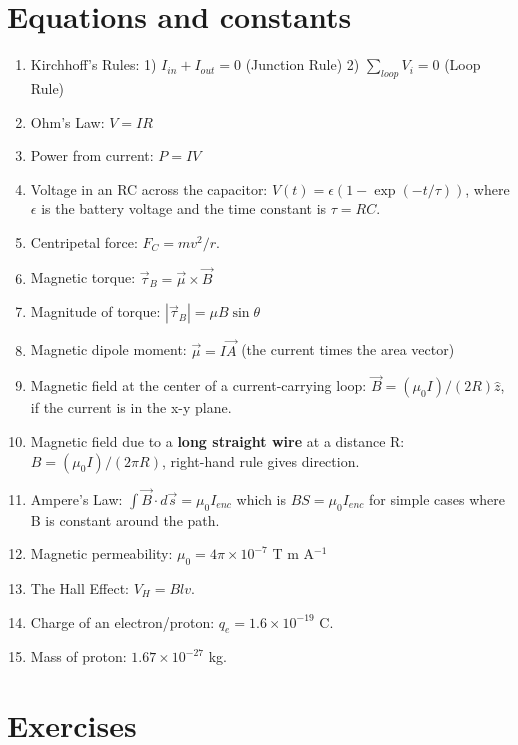\documentclass[10pt]{article}
\begin{document}
\maketitle

\section{Equations and constants}

\begin{enumerate}
\item Kirchhoff's Rules: 1) $I_{in} + I_{out} = 0$ (Junction Rule) 2) $\sum_{loop} V_i = 0$ (Loop Rule)
\item Ohm's Law: $V = IR$
\item Power from current: $P=IV$
\item Voltage in an RC across the capacitor: $V(t) = \epsilon\left(1 - \exp\left(-t/\tau\right)\right)$, where $\epsilon$ is the battery voltage and the time constant is $\tau = RC$.
\item Centripetal force: $F_C = mv^2/r$.
\item Magnetic torque: $\vec{\tau}_B = \vec{\mu} \times \vec{B}$
\item Magnitude of torque: $|\vec{\tau}_B| = \mu B \sin\theta$
\item Magnetic dipole moment: $\vec{\mu} = I \vec{A}$ (the current times the area vector)
\item Magnetic field at the center of a current-carrying loop: $\vec{B} = (\mu_0 I)/(2 R)\hat{z}$, if the current is in the x-y plane.
\item Magnetic field due to a \textbf{long straight wire} at a distance R: $B = (\mu_0 I)/(2 \pi R)$, right-hand rule gives direction.
\item Ampere's Law: $\int \vec{B} \cdot d\vec{s} = \mu_0 I_{enc}$ which is $B S = \mu_0 I_{enc}$ for simple cases where B is constant around the path.
\item Magnetic permeability: $\mu_0 = 4\pi \times 10^{-7}$ T m A$^{-1}$
\item The Hall Effect: $V_H = B l v$.
\item Charge of an electron/proton: $q_e = 1.6 \times 10^{-19}$ C.
\item Mass of proton: $1.67 \times 10^{-27}$ kg.
\end{enumerate}

\clearpage

\section{Exercises}
\end{document}
